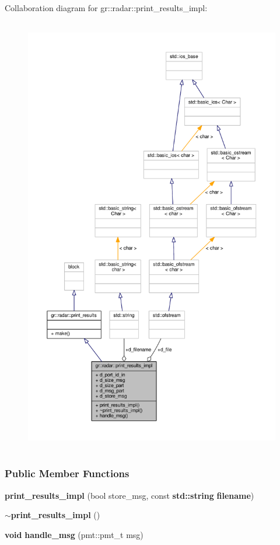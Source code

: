 Collaboration diagram for gr\+:\+:radar\+:\+:print\+\_\+results\+\_\+impl\+:
\nopagebreak
\begin{figure}[H]
\begin{center}
\leavevmode
\includegraphics[height=550pt]{d3/de8/classgr_1_1radar_1_1print__results__impl__coll__graph}
\end{center}
\end{figure}
\subsubsection*{Public Member Functions}
\begin{DoxyCompactItemize}
\item 
{\bf print\+\_\+results\+\_\+impl} (bool store\+\_\+msg, const {\bf std\+::string} {\bf filename})
\item 
{\bf $\sim$print\+\_\+results\+\_\+impl} ()
\item 
{\bf void} {\bf handle\+\_\+msg} (pmt\+::pmt\+\_\+t msg)
\end{DoxyCompactItemize}
